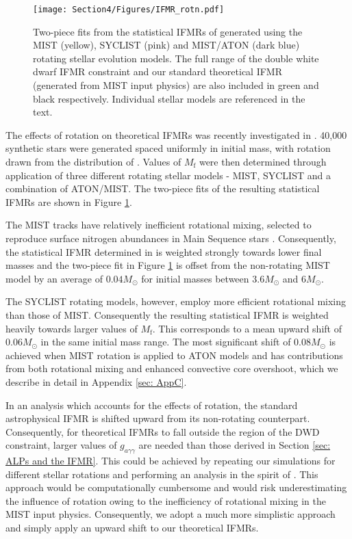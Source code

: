 \begin{figure}[t]
    \centering
    \texttt{[image: Section4/Figures/IFMR\_rotn.pdf]}
    \caption{Two-piece fits from the statistical IFMRs of \cite{Cummings_2019} generated using the MIST (yellow), SYCLIST (pink) and MIST/ATON (dark blue) rotating stellar evolution models. The full range of the double white dwarf IFMR constraint \cite{Andrews} and our standard theoretical IFMR (generated from MIST input physics) are also included in green and black respectively. Individual stellar models are referenced in the text.}
    \label{fig: Rotn IFMRs}
\end{figure}

The effects of rotation on theoretical IFMRs was recently investigated in \cite{Cummings_2019}. 40,000 synthetic stars were generated spaced uniformly in initial mass, with rotation drawn from the distribution of \cite{Huang2010}. Values of $M_{\mathrm{f}}$ were then determined through application of three different rotating stellar models - MIST, SYCLIST \cite{SYCLIST1, SYCLIST2} and a combination of ATON/MIST. The two-piece fits of the resulting statistical IFMRs are shown in Figure \ref{fig: Rotn IFMRs}.


The MIST tracks have relatively inefficient rotational mixing, selected to reproduce surface nitrogen abundances in Main Sequence stars \cite{MIST1}. Consequently, the statistical IFMR determined in \cite{Cummings_2019} is weighted strongly towards lower final masses and the two-piece fit in Figure \ref{fig: Rotn IFMRs} is offset from the non-rotating MIST model by an average of $0.04M_{\odot}$ for initial masses between $3.6M_{\odot}$ and $6M_{\odot}$.


The SYCLIST rotating models, however, employ more efficient rotational mixing than those of MIST. Consequently the resulting statistical IFMR is weighted heavily towards larger values of $M_{\mathrm{f}}$. This corresponds to a mean upward shift of $0.06M_{\odot}$ in the same initial mass range. The most significant shift of $0.08M_{\odot}$ is achieved when MIST rotation is applied to ATON models \cite{ATON} and has contributions from both rotational mixing and enhanced convective core overshoot, which we describe in detail in Appendix \ref{sec: AppC}. 



In an analysis which accounts for the effects of rotation, the standard astrophysical IFMR is shifted upward from its non-rotating counterpart. Consequently, for theoretical IFMRs to fall outside the region of the DWD constraint, larger values of $g_{a\gamma\gamma}$ are needed than those derived in Section \ref{sec: ALPs and the IFMR}. This could be achieved by repeating our simulations for different stellar rotations and performing an analysis in the spirit of \cite{Cummings_2019}. This approach would be computationally cumbersome and would risk underestimating the influence of rotation owing to the inefficiency of rotational mixing in the MIST input physics. Consequently, we adopt a much more simplistic approach and simply apply an upward shift to our theoretical IFMRs.



